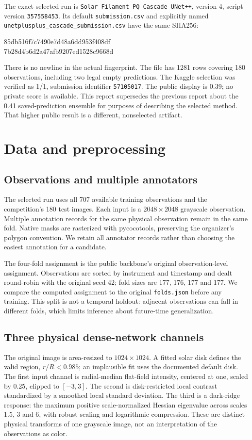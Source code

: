 \documentclass[sigconf]{acmart}
\begin{document}
The exact selected run is \texttt{Solar Filament PQ Cascade UNet++}, version 4, script version \texttt{357558453}. Its default \texttt{submission.csv} and explicitly named \texttt{unetplusplus\_cascade\_submission.csv} have the same SHA256:
\begin{center}\small\ttfamily
85db516f7c7490e7d48a6dd953f408df\\
7b28d4b6d2a47afb9207ed1528c9668d
\end{center}
There is no newline in the actual fingerprint. The file has 1281 rows covering 180 observations, including two legal empty predictions. The Kaggle selection was verified as 1/1, submission identifier \texttt{57105017}. The public display is 0.39; no private score is available. This report supersedes the previous report about the 0.41 saved-prediction ensemble for purposes of describing the selected method. That higher public result is a different, nonselected artifact.

\section{Data and preprocessing}
\subsection{Observations and multiple annotators}
The selected run uses all 707 available training observations and the competition's 180 test images. Each input is a $2048\times2048$ grayscale observation. Multiple annotation records for the same physical observation remain in the same fold. Native masks are rasterized with pycocotools, preserving the organizer's polygon convention. We retain all annotator records rather than choosing the easiest annotation for a candidate.

The four-fold assignment is the public backbone's original observation-level assignment. Observations are sorted by instrument and timestamp and dealt round-robin with the original seed 42; fold sizes are 177, 176, 177 and 177. We compare the computed assignment to the original \texttt{folds.json} before any training. This split is not a temporal holdout: adjacent observations can fall in different folds, which limits inference about future-time generalization.

\subsection{Three physical dense-network channels}
The original image is area-resized to $1024\times1024$. A fitted solar disk defines the valid region, $r/R<0.985$; an implausible fit uses the documented default disk. The first input channel is radial-median flat-field intensity, centered at one, scaled by 0.25, clipped to $[-3,3]$. The second is disk-restricted local contrast standardized by a smoothed local standard deviation. The third is a dark-ridge response: the maximum positive scale-normalized Hessian eigenvalue across scales 1.5, 3 and 6, with robust scaling and logarithmic compression. These are distinct physical transforms of one grayscale image, not an interpretation of the observations as color.
\end{document}
